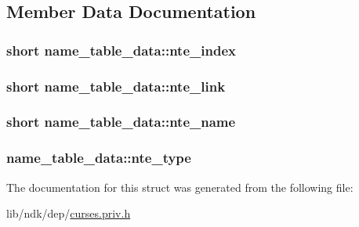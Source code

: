 \subsection{Member Data Documentation}
\hypertarget{structname__table__data_a8d7c7c4823598c75022d5a7a61a64816}{
\subsubsection[{nte\-\_\-index}]{\setlength{\rightskip}{0pt plus 5cm}short name\-\_\-table\-\_\-data\-::nte\-\_\-index}}\label{structname__table__data_a8d7c7c4823598c75022d5a7a61a64816}
\hypertarget{structname__table__data_ab94e94df70acd457828ac46c92e1e089}{
\subsubsection[{nte\-\_\-link}]{\setlength{\rightskip}{0pt plus 5cm}short name\-\_\-table\-\_\-data\-::nte\-\_\-link}}\label{structname__table__data_ab94e94df70acd457828ac46c92e1e089}
\hypertarget{structname__table__data_a312ad70ad13d267ef7cd269606929b31}{
\subsubsection[{nte\-\_\-name}]{\setlength{\rightskip}{0pt plus 5cm}short name\-\_\-table\-\_\-data\-::nte\-\_\-name}}\label{structname__table__data_a312ad70ad13d267ef7cd269606929b31}
\hypertarget{structname__table__data_a990f7e4e33c021d319c461d52358e0df}{
\subsubsection[{nte\-\_\-type}]{ name\-\_\-table\-\_\-data\-::nte\-\_\-type}}\label{structname__table__data_a990f7e4e33c021d319c461d52358e0df}


The documentation for this struct was generated from the following file\-:\begin{DoxyCompactItemize}
\item 
lib/ndk/dep/\hyperlink{curses_8priv_8h}{curses.\-priv.\-h}\end{DoxyCompactItemize}
